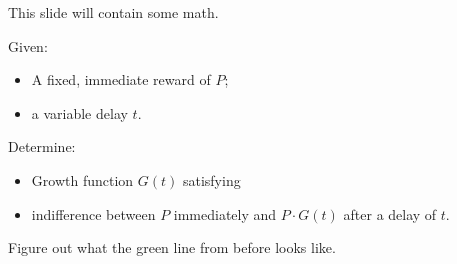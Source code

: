 \pause This slide will contain some math. \pause \bigskip

Given: \pause
\begin{itemize}
    \item A fixed, immediate reward of $P$\pause;
    \item a variable delay $t$. \pause
\end{itemize}

Determine: \pause
\begin{itemize}
    \item Growth function $G(t)$ \pause  satisfying
    \item indifference between $P$ immediately and $P\cdot G(t)$ after a delay of $t$. \pause
\end{itemize}
\bigskip

Figure out what the green line from before looks like.
